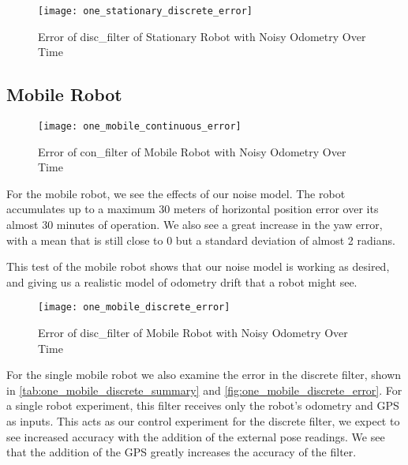 \documentclass[thesis.tex]{subfile}
\begin{document}


\begin{figure}
\centering
\texttt{[image: one\_stationary\_discrete\_error]}
\caption{Error of \gls{disc_filter} of Stationary Robot with Noisy Odometry Over Time}
\label{fig:one_stationary_noisy_dicrete_error}
\end{figure}

\subsection{Mobile Robot} \label{sec:Mobile Robot}


\begin{figure}
\centering
\texttt{[image: one\_mobile\_continuous\_error]}
\caption{Error of \gls{con_filter} of Mobile Robot with Noisy Odometry Over Time}
\label{fig:one_mobile_continuous_error}
\end{figure}

For the mobile robot, we see the effects of our noise model. The robot accumulates up to a maximum 30 meters of horizontal position error over its almost 30 minutes of operation. We also see a great increase in the yaw error, with a mean that is still close to 0 but a standard deviation of almost 2 radians.

This test of the mobile robot shows that our noise model is working as desired, and giving us a realistic model of odometry drift that a robot might see.



\begin{figure}
\centering
\texttt{[image: one\_mobile\_discrete\_error]}
\caption{Error of \gls{disc_filter} of Mobile Robot with Noisy Odometry Over Time}
\label{fig:one_mobile_discrete_error}
\end{figure}

For the single mobile robot we also examine the error in the discrete filter, shown in \autoref{tab:one_mobile_discrete_summary} and \autoref{fig:one_mobile_discrete_error}. For a single robot experiment, this filter receives only the robot's odometry and GPS as inputs. This acts as our control experiment for the discrete filter, we expect to see increased accuracy with the addition of the external pose readings. We see that the addition of the GPS greatly increases the accuracy of the filter.
\end{document}
